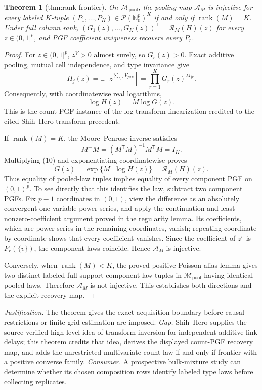 \documentclass{article}
\newtheorem{theorem}{Theorem}
\begin{document}
\begin{theorem}[thm:rank-frontier]\label{thm:rank-frontier}
On \(\mathcal M_{\mathrm{pool}}\), the pooling map \(\mathscr A_M\) is injective for every labeled \(K\)-tuple \((P_1,\ldots,P_K)\in\mathcal P(\mathbb N_0^p)^K\) if and only if \(\operatorname{rank}(M)=K\). Under full column rank, \((G_1(z),\ldots,G_K(z))^{\mathsf T}=\mathscr R_M(H)(z)\) for every \(z\in(0,1]^p\), and PGF coefficient uniqueness recovers every \(P_r\).
\end{theorem}
\begin{proof}
For \(z\in(0,1]^p\), \(z^V>0\) almost surely, so \(G_r(z)>0\).  Exact additive pooling, mutual cell independence, and type invariance give
\[
H_j(z)
=\mathbb E\!\left[
z^{\sum_{r,c}V_{jirc}}\right]
=\prod_{r=1}^KG_r(z)^{M_{jr}}. \tag{9}
\]
Consequently, with coordinatewise real logarithms,
\[
\log H(z)=M\log G(z). \tag{10}
\]
This is the count-PGF instance of the log-transform linearization credited to the cited Shih--Hero transform precedent.

If \(\operatorname{rank}(M)=K\), the Moore--Penrose inverse satisfies
\[
M^+M=(M^{\mathsf T}M)^{-1}M^{\mathsf T}M=I_K.
\]
Multiplying (10) and exponentiating coordinatewise proves
\[
G(z)=\exp\{M^+\log H(z)\}=\mathscr R_M(H)(z). \tag{11}
\]
Thus equality of pooled-law tuples implies equality of every component PGF on \((0,1)^p\).  To see directly that this identifies the law, subtract two component PGFs.  Fix \(p-1\) coordinates in \((0,1)\), view the difference as an absolutely convergent one-variable power series, and apply the continuation-and-least-nonzero-coefficient argument proved in the regularity lemma.  Its coefficients, which are power series in the remaining coordinates, vanish; repeating coordinate by coordinate shows that every coefficient vanishes.  Since the coefficient of \(z^v\) is \(P_r(\{v\})\), the component laws coincide.  Hence \(\mathscr A_M\) is injective.

Conversely, when \(\operatorname{rank}(M)<K\), the proved positive-Poisson alias lemma gives two distinct labeled full-support component-law tuples in \(\mathcal M_{\mathrm{pool}}\) having identical pooled laws.  Therefore \(\mathscr A_M\) is not injective.  This establishes both directions and the explicit recovery map.
\end{proof}
\par\smallskip\noindent \textit{Justification.} The theorem gives the exact acquisition boundary before causal restrictions or finite-grid estimation are imposed. \textit{Gap.} Shih--Hero supplies the source-verified high-level idea of transform inversion for independent additive link delays; this theorem credits that idea, derives the displayed count-PGF recovery map, and adds the unrestricted multivariate count-law if-and-only-if frontier with a positive converse family. \textit{Consumer.} A prospective bulk-mixture study can determine whether its chosen composition rows identify labeled type laws before collecting replicates.
\end{document}
